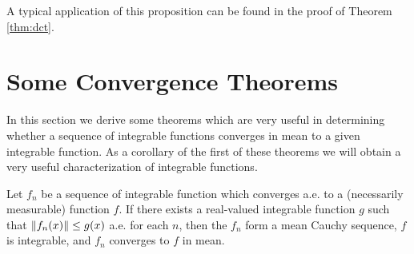 A typical application of this proposition can be found in the proof of Theorem \ref{thm:dct}.

\section{Some Convergence Theorems}

In this section we derive some theorems which are very useful in determining whether a sequence of integrable functions converges in mean to a given integrable function. As a corollary of the first of these theorems we will obtain a very useful characterization of integrable functions.

\begin{theorem}
\label{thm:dct}
Let $f_n$ be a sequence of integrable function which converges a.e. to a (necessarily measurable) function $f$. If there exists a real-valued integrable function $g$ such that $\norm{f_n(x)}\leq g(x)$ a.e. for each $n$, then the $f_n$ form a mean Cauchy sequence, $f$ is integrable, and $f_n$ converges to $f$ in mean.
\end{theorem}

